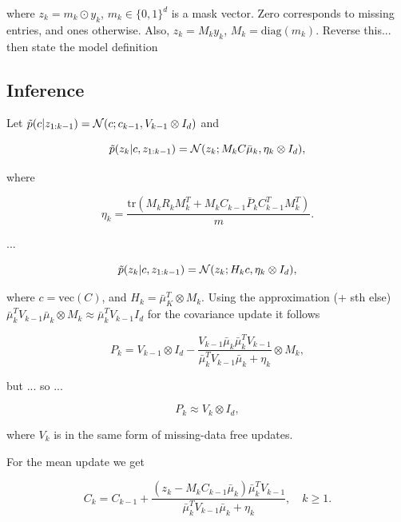 \documentclass{mldsmsc}
\begin{document}
\noindent where $z_k = m_k \odot y_k$, $m_k \in \{0, 1\}^d$ is a mask vector. Zero corresponds to missing entries, and ones otherwise. Also, $z_k = M_k y_k$, $M_k = \text{diag}(m_k)$. Reverse this... then state the model definition \newline

\subsection{Inference}

Let $\Tilde{p}(c | z_{1:k-1}) = \mathcal{N}(c; c_{k-1}, V_{k-1} \otimes I_d)$ and 

\begin{equation}
    \Tilde{p}(z_k | c, z_{1:k-1}) = \mathcal{N}(z_k; M_k C \bar{\mu}_k, \eta_k \otimes I_d), 
\end{equation}

\noindent where 

\begin{equation}
    \eta_k = \frac{\text{tr}(M_k R_k M_k^T + M_k C_{k-1} \bar{P}_k C_{k-1}^T M_k^T)}{m}.
\end{equation}

...

\begin{equation}
    \Tilde{p}(z_k | c, z_{1:k-1}) = \mathcal{N}(z_k; H_k c, \eta_k \otimes I_d),
\end{equation}

\noindent where $c = \text{vec}(C)$, and $H_k = \bar{\mu}_K^T \otimes M_k$. Using the approximation (+ sth else) $\bar{\mu}_k^T V_{k-1} \bar{\mu}_k \otimes M_k \approx \bar{\mu}_k^T V_{k-1} I_d$ for the covariance update it follows

\begin{equation}
    P_k = V_{k-1} \otimes I_d - \frac{V_{k-1} \bar{\mu}_k \bar{\mu}_k^T V_{k-1}}{\bar{\mu}_k^T V_{k-1} \bar{\mu}_k + \eta_k} \otimes M_k,
\end{equation}

but ... so ...

\begin{equation}
    P_k \approx V_k \otimes I_d,
\end{equation}

\noindent where $V_k$ is in the same form of missing-data free updates. \newline

\noindent For the mean update we get

\begin{equation}
    C_k = C_{k-1} + \frac{\left( z_k - M_k C_{k-1} \bar{\mu}_k \right) \bar{\mu}_k^T V_{k-1}}{\bar{\mu}_k^T V_{k-1} \bar{\mu}_k + \eta_k}, \quad k \geq 1.
\end{equation}
\end{document}
